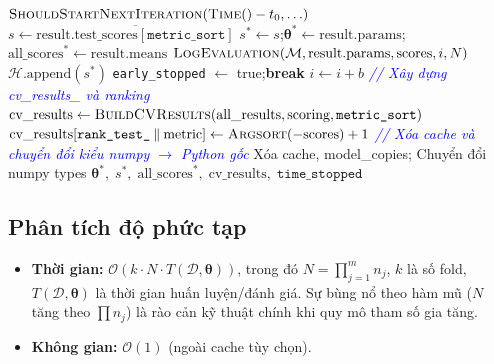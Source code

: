 \documentclass[12pt,a4paper]{article}
\begin{document}
\begin{algorithm}[H]
\begin{algorithmic}[1]
    \State $\textsc{ShouldStartNextIteration}(\textsc{Time}() - t_0, \ldots)$ 
            \State $s \gets \overline{\text{result.test\_scores}[\texttt{metric\_sort}]}$
                \State $s^* \gets s$;\quad $\boldsymbol{\theta}^* \gets \text{result.params}$;\quad $\text{all\_scores}^* \gets \text{result.means}$
            \EndIf
        \EndIf
        \State $\textsc{LogEvaluation}(\mathcal{M}, \text{result.params}, \text{scores}, i, N)$
    \EndFor
    \State $\mathcal{H}.\text{append}(s^*)$ 
        \State \texttt{early\_stopped} $\gets$ true;\quad \textbf{break}
    \EndIf
    \State $i \gets i + b$
\EndWhile
\Statex \textcolor{blue}{\textit{// Xây dựng cv\_results\_ và ranking}}
\State $\text{cv\_results} \gets \textsc{BuildCVResults}(\text{all\_results}, \text{scoring}, \texttt{metric\_sort})$
    \State $\text{cv\_results}[\texttt{rank\_test\_} \mathbin{\Vert} \text{metric}] \gets \textsc{Argsort}(-\text{scores}) + 1$
\EndFor
\Statex \textcolor{blue}{\textit{// Xóa cache và chuyển đổi kiểu numpy $\rightarrow$ Python gốc}}
\State Xóa cache, model\_copies; Chuyển đổi numpy types
\State \Return $\boldsymbol{\theta}^*,\; s^*,\; \text{all\_scores}^*,\; \text{cv\_results},\; \texttt{time\_stopped}$
\end{algorithmic}
\end{algorithm}

\subsection{Phân tích độ phức tạp}

\begin{itemize}
    \item \textbf{Thời gian:}
    $\mathcal{O}\!\left(k \cdot N \cdot T(\mathcal{D}, \boldsymbol{\theta})\right)$,
    trong đó $N = \prod_{j=1}^{m} n_j$, $k$ là số fold,
    $T(\mathcal{D}, \boldsymbol{\theta})$ là thời gian huấn luyện/đánh giá.
    Sự bùng nổ theo hàm mũ ($N$ tăng theo $\prod n_j$) là rào cản kỹ thuật
    chính khi quy mô tham số gia tăng.

    \item \textbf{Không gian:} $\mathcal{O}(1)$ (ngoài cache tùy chọn).
\end{itemize}
\end{document}
